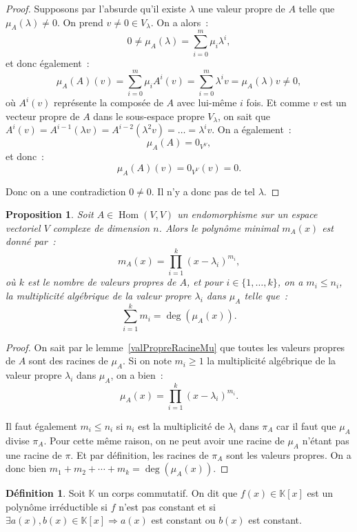\documentclass{article}
\DeclareMathOperator{\Hom}{Hom}
\newcommand{\K}{\mathbb K}
\newtheorem{prp}[thm]{Proposition}
\theoremstyle{definition}
\newtheorem{déf}[thm]{Définition}
\theoremstyle{remark}
\begin{document}
		\begin{proof} Supposons par l'absurde qu'il existe $\lambda$ une valeur propre de $A$ telle que $\mu_A(\lambda) \neq 0$. On prend $v \neq 0 \in V_\lambda$.
		On a alors~:
		\[0 \neq \mu_A(\lambda) = \sum_{i=0}^m\mu_i\lambda^i,\]
		et donc également~:
		\[\mu_A(A)(v) = \sum_{i=0}^m\mu_iA^i(v) = \sum_{i=0}^m\lambda^iv = \mu_A(\lambda)v \neq 0,\]
		où $A^i(v)$ représente la composée de $A$ avec lui-même $i$ fois. Et comme $v$ est un vecteur propre de $A$ dans le sous-espace propre $V_\lambda$, on
		sait que $A^i(v) = A^{i-1}(\lambda v) = A^{i-2}(\lambda^2v) = \ldots = \lambda^iv$. On a également~:
		\[\mu_A(A) = 0_{V^V},\]
		et donc~:
		\[\mu_A(A)(v) = 0_{V^V}(v) = 0.\]

		Donc on a une contradiction $0 \neq 0$. Il n'y a donc pas de tel $\lambda$. \end{proof}

		\begin{prp} Soit $A \in \Hom(V, V)$ un endomorphisme sur un espace vectoriel $V$ complexe de dimension $n$. Alors le polynôme minimal $m_A(x)$ est donné par~:
		\[m_A(x) = \prod_{i=1}^k(x-\lambda_i)^{m_i},\]
		où $k$ est le nombre de valeurs propres de $A$, et pour $i \in \{1, \dotsc, k\}$, on a $m_i \leq n_i$, la multiplicité algébrique de la valeur propre
		$\lambda_i$ dans $\mu_A$ telle que~: \[\sum_{i=1}^km_i = \deg(\mu_A(x)).\] \end{prp}

		\begin{proof} On sait par le lemme~\ref{valPropreRacineMu} que toutes les valeurs propres de $A$ sont des racines de $\mu_A$. Si on note $m_i \geq 1$ la
		multiplicité algébrique de la valeur propre $\lambda_i$ dans $\mu_A$, on a bien~:
		\[\mu_A(x) = \prod_{i=1}^k(x-\lambda_i)^{m_i}.\]
		
		Il faut également $m_i \leq n_i$ si $n_i$ est la multiplicité de $\lambda_i$ dans $\pi_A$ car il faut que $\mu_A$ divise $\pi_A$. Pour cette même raison, on
		ne peut avoir une racine de $\mu_A$ n'étant pas une racine de $\pi$. Et par définition, les racines de $\pi_A$ sont les valeurs propres.
		On a donc bien $m_1 + m_2 + \dotsb + m_k = \deg(\mu_A(x))$. \end{proof}

		\begin{déf} Soit $\K$ un corps commutatif. On dit que $f(x) \in \K[x]$ est un polynôme irréductible si $f$ n'est pas constant et si
		$\exists a(x), b(x) \in \K[x] \Rightarrow a(x)$ est constant ou $b(x)$ est constant. \end{déf}
\end{document}
